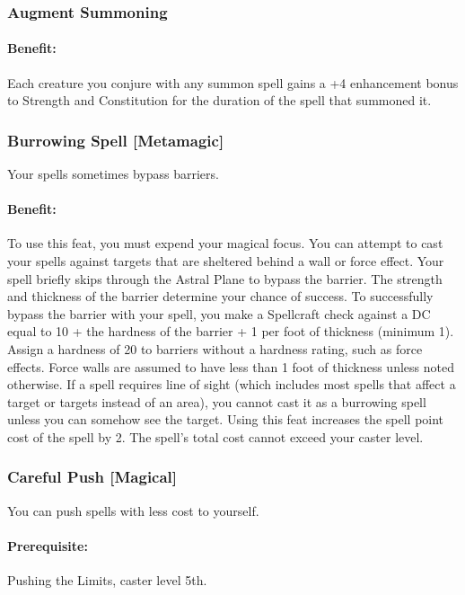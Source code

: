 \subsubsection{Augment Summoning}
\label{Feat:AugmentSummoning}
\paragraph{Benefit:}
Each creature you conjure with any summon spell gains a +4 enhancement bonus to Strength and Constitution for the duration of the spell that summoned it.

\subsubsection[Burrowing Spell]{Burrowing Spell [Metamagic]}
\label{Feat:BurrowingSpell}
Your spells sometimes bypass barriers.

\paragraph{Benefit:} To use this feat, you must expend your magical focus. 
You can attempt to cast your spells against targets that are sheltered behind a wall or force effect. 
Your spell briefly skips through the Astral Plane to bypass the barrier.
The strength and thickness of the barrier determine your chance of success. 
To successfully bypass the barrier with your spell, 
you make a Spellcraft check against a DC equal to 10 + the hardness of the barrier + 1 per foot of thickness (minimum 1). 
Assign a hardness of 20 to barriers without a hardness rating, such as force effects. 
Force walls are assumed to have less than 1 foot of thickness unless noted otherwise.
If a spell requires line of sight (which includes most spells that affect a target or targets instead of an area), 
you cannot cast it as a burrowing spell unless you can somehow see the target.%
Using this feat increases the spell point cost of the spell by 2. The spell's total cost cannot exceed your caster level.

\subsubsection[Careful Push]{Careful Push [Magical]}
\label{Feat:CarefulPush}
You can push spells with less cost to yourself.

\paragraph{Prerequisite:} Pushing the Limits, caster level 5th.

